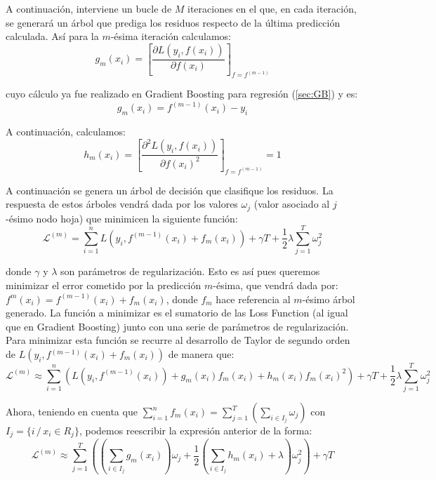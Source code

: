 \documentclass[12pt,twoside]{article}
\begin{document}
A continuación, interviene un bucle de $M$ iteraciones en el que, en cada iteración, se generará un árbol que prediga los residuos respecto de la última predicción calculada. Así para la $m$-ésima iteración calculamos:
\begin{equation*}
g_{m}(x_i) = \left[ \frac{\partial L(y_i, f(x_i))}{\partial f(x_i)} \right]_{f = f^{(m-1)}}
\end{equation*}

\noindent 
cuyo cálculo ya fue realizado en Gradient Boosting para regresión (\ref{sec:GB}) y es:
\begin{equation*}
g_{m}(x_i) = f^{(m-1)}(x_i) - y_i
\end{equation*}

A continuación, calculamos:
\begin{equation*}
h_{m}(x_i) = \left[ \frac{\partial^2 L(y_i, f(x_i))}{\partial f(x_i)^2} \right]_{f = f^{(m-1)}} = 1
\end{equation*}

A continuación se genera un árbol de decisión que clasifique los residuos. La respuesta de estos árboles vendrá dada por los valores $\omega_j$ (valor asociado al $j$-ésimo nodo hoja) que minimicen la siguiente función:
\begin{equation*}
\mathcal{L}^{(m)} = \sum_{i=1}^n L(y_i, f^{(m-1)}(x_i) + f_m(x_i)) + \gamma T + \frac{1}{2}\lambda \sum_{j=1}^T \omega_j^2
\end{equation*}

\noindent
donde $\gamma$ y $\lambda$ son parámetros de regularización. Esto es así pues queremos minimizar el error cometido por la predicción $m$-ésima, que vendrá dada por: $f^m(x_i) = f^{(m-1)}(x_i) + f_m(x_i)$, donde $f_m$ hace referencia al $m$-ésimo árbol generado. La función a minimizar es el sumatorio de las Loss Function (al igual que en Gradient Boosting) junto con una serie de parámetros de regularización. Para minimizar esta función se recurre al desarrollo de Taylor de segundo orden de $L(y_i, f{^{(m-1)}}(x_i) + f_m(x_i))$ de manera que:
\begin{equation*}
\mathcal{L}^{(m)} \approx \sum_{i=1}^n \left( L(y_i, f^{(m-1)}(x_i)) + g_m(x_i)f_m(x_i) + h_m(x_i)f_m(x_i)^2 \right)  + \gamma T + \frac{1}{2}\lambda \sum_{j=1}^T \omega_j^2
\end{equation*}

Ahora, teniendo en cuenta que $ \displaystyle \sum_{i=1}^n f_m(x_i) = \sum_{j = 1}^T \left( \sum_{i \in I_j} \omega_j \right)$ con $I_j = \{ i \, / \, x_i \in R_j \}$, podemos reescribir la expresión anterior de la forma:
\begin{equation*}
\mathcal{L}^{(m)} \approx \sum_{j = 1}^T \left( (\sum_{i \in I_j} g_m(x_i))\omega_j + \frac{1}{2}(\sum_{i\in I_j} h_m(x_i) + \lambda)\omega_j^2 \right) + \gamma T
\end{equation*}
\end{document}
